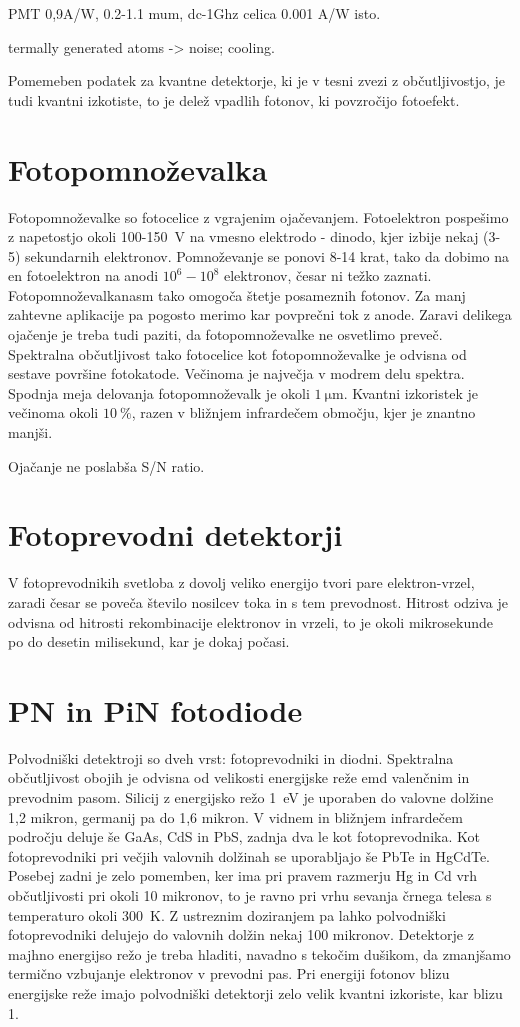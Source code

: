 PMT 0,9A/W, 0.2-1.1 mum, dc-1Ghz
celica 0.001 A/W isto.

termally generated atoms -> noise; cooling. 

Pomemeben podatek za kvantne detektorje, ki je v tesni zvezi 
z občutljivostjo, je tudi kvantni izkotiste, to je delež vpadlih fotonov, ki povzročijo fotoefekt.


\section{Fotopomnoževalka}
Fotopomnoževalke so fotocelice z vgrajenim ojačevanjem. Fotoelektron pospešimo z napetostjo
okoli 100-150~V na vmesno elektrodo - dinodo, kjer izbije nekaj (3-5) sekundarnih elektronov. 
Pomnoževanje se ponovi 8-14 krat, tako da dobimo na en fotoelektron na anodi $10^6 - 10^8$ 
elektronov, česar ni težko zaznati. Fotopomnoževalkanasm tako omogoča štetje posameznih fotonov.
Za manj zahtevne aplikacije pa pogosto merimo kar povprečni tok z anode. Zaravi delikega ojačenje
je treba tudi paziti, da fotopomnoževalke ne osvetlimo preveč. Spektralna občutljivost
tako fotocelice kot fotopomnoževalke je odvisna od sestave površine fotokatode. Večinoma
je največja v modrem delu spektra. Spodnja meja delovanja fotopomnoževalk je okoli $1~\si{\micro\metre}$.
Kvantni izkoristek je večinoma okoli $10~\%$, razen v bližnjem infrardečem območju, kjer
je znantno manjši. 

Ojačanje ne poslabša S/N ratio. 


\section{Fotoprevodni detektorji}
V fotoprevodnikih svetloba z dovolj veliko energijo tvori pare elektron-vrzel, zaradi  česar
se poveča število nosilcev toka in s tem prevodnost. Hitrost odziva je odvisna od hitrosti
rekombinacije elektronov in vrzeli, to je okoli mikrosekunde po do desetin milisekund, kar
je dokaj počasi. 

\section{PN in PiN fotodiode}
Polvodniški detektroji so dveh vrst: fotoprevodniki in diodni. Spektralna občutljivost
obojih je odvisna od velikosti energijske reže emd valenčnim in prevodnim pasom. Silicij
z energijsko režo 1~eV je uporaben do valovne dolžine 1,2 mikron, germanij pa do 1,6 mikron.
V vidnem in bližnjem infrardečem področju deluje še GaAs, CdS in PbS, zadnja dva le kot
fotoprevodnika. Kot fotoprevodniki pri večjih valovnih dolžinah se uporabljajo  še PbTe
in HgCdTe. Posebej zadni je zelo pomemben, ker ima pri pravem razmerju Hg in Cd vrh občutljivosti
pri okoli 10 mikronov, to je ravno pri vrhu sevanja črnega telesa s temperaturo okoli 300~K. 
Z ustreznim doziranjem pa lahko polvodniški fotoprevodniki delujejo do valovnih dolžin nekaj 100 mikronov.
Detektorje  z majhno energijso režo je treba hladiti, navadno s tekočim dušikom, da zmanjšamo
termično vzbujanje elektronov v prevodni pas. Pri energiji fotonov blizu energijske reže 
imajo polvodniški detektorji zelo velik kvantni izkoriste, kar blizu 1.

